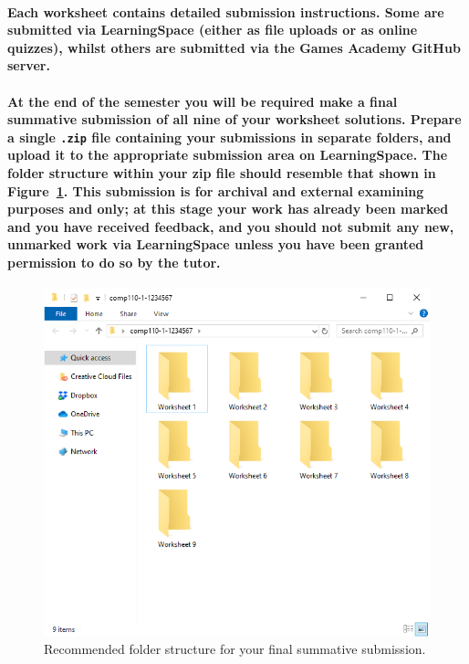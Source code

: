 \documentclass{../../fal_assignment}
\begin{document}
\paragraph{Each worksheet contains detailed submission instructions. 
	Some are submitted via \textbf{LearningSpace} (either as \textbf{file uploads} or as \textbf{online quizzes}),
	whilst others are submitted via the Games Academy \textbf{GitHub} server.}

\paragraph{At the end of the semester you will be required make a final summative submission of all nine of your worksheet solutions.
Prepare a \textbf{single \texttt{.zip} file} containing your submissions \textbf{in separate folders}, and upload it to the appropriate submission area on LearningSpace. The folder structure within your zip file should resemble that shown in Figure~\ref{fig:folder_structure}.
This submission is for archival and external examining purposes and only; at this stage your work has already been marked and you have received feedback, and you should \textbf{not} submit any new, unmarked work via LearningSpace unless you have been granted permission to do so by the tutor.}
\begin{figure}
    \begin{center}
        \includegraphics[height=0.4\textheight]{folder_structure}
    \end{center}
    \caption{Recommended folder structure for your final summative submission.}
    \label{fig:folder_structure}
\end{figure}
\end{document}
